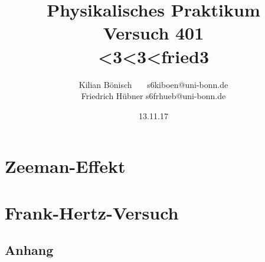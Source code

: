 \documentclass{report}
\newcommand{\RM}[1]{\MakeUppercase{\romannumeral #1}}
\begin{document}
\setlength{\parindent}{0em}   %
\title{Physikalisches Praktikum \RM{4}\\Versuch 401\\<3<3<fried3}
\author{Kilian Bönisch \ \ \ \qquad s6kiboen@uni-bonn.de \\
  Friedrich Hübner \qquad s6frhueb@uni-bonn.de }
\date{13.11.17}

\maketitle

\newpage

\thispagestyle{empty}

\tableofcontents

\newpage



\chapter{Zeeman-Effekt}




\chapter{Frank-Hertz-Versuch}







\section{Anhang}
%

\FloatBarrier
\printbibliography

\newpage
\end{document}
